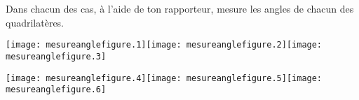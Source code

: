 Dans chacun des cas, à l'aide de ton rapporteur, mesure les angles de chacun des quadrilatères.
\par
\texttt{[image: mesureanglefigure.1]}\hfill\texttt{[image: mesureanglefigure.2]}\hfill\texttt{[image: mesureanglefigure.3]}
\par
\texttt{[image: mesureanglefigure.4]}\hfill\texttt{[image: mesureanglefigure.5]}\hfill\texttt{[image: mesureanglefigure.6]}
